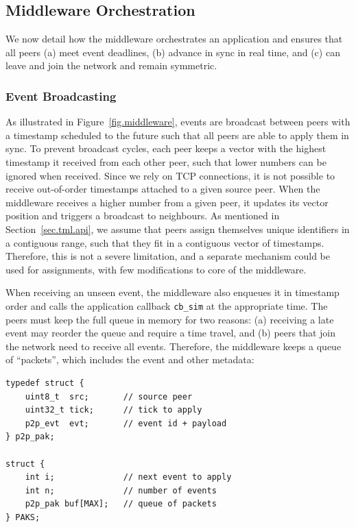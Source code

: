 \documentclass[10pt,journal,compsoc]{IEEEtran}
\newcommand{\code}[1]  {\texttt{\footnotesize{#1}}}
\begin{document}
\subsection{Middleware Orchestration}
\label{sec.tml.middleware}

We now detail how the middleware orchestrates an application and ensures that
all peers
    (a) meet event deadlines,
    (b) advance in sync in real time, and
    (c) can leave and join the network and remain symmetric.

\subsubsection{Event Broadcasting}
\label{sec.tml.middleware.events}

As illustrated in Figure~\ref{fig.middleware}, events are broadcast between
peers with a timestamp scheduled to the future such that all peers are able to
apply them in sync.
%
To prevent broadcast cycles, each peer keeps a vector with the highest
timestamp it received from each other peer, such that lower numbers can be
ignored when received.
Since we rely on TCP connections, it is not possible to receive out-of-order
timestamps attached to a given source peer.
When the middleware receives a higher number from a given peer, it updates its
vector position and triggers a broadcast to neighbours.
%
As mentioned in Section~\ref{sec.tml.api}, we assume that peers assign
themselves unique identifiers in a contiguous range, such that they fit in a
contiguous vector of timestamps.
Therefore, this is not a severe limitation, and a separate mechanism could be
used for assignments, with few modifications to core of the middleware.

When receiving an unseen event, the middleware also enqueues it in timestamp
order and calls the application callback \code{cb\_sim} at the appropriate
time.
The peers must keep the full queue in memory for two reasons:
    (a) receiving a late event may reorder the queue and require a time
        travel, and
    (b) peers that join the network need to receive all events.
%
Therefore, the middleware keeps a queue of ``packets'', which includes the
event and other metadata:

{\footnotesize
\begin{verbatim}
typedef struct {
    uint8_t  src;       // source peer
    uint32_t tick;      // tick to apply
    p2p_evt  evt;       // event id + payload
} p2p_pak;

struct {
    int i;              // next event to apply
    int n;              // number of events
    p2p_pak buf[MAX];   // queue of packets
} PAKS;
\end{verbatim}
}
\end{document}
